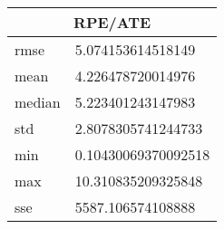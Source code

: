 \begin{table}[!ht] 
 \centering 
 \begin{tabular}{|l|l|} \hline 
 \multicolumn{2}{|c|}{RPE/ATE} \\ \hline 
 rmse & 5.074153614518149 \\ \hline 
mean & 4.226478720014976 \\ \hline 
median & 5.223401243147983 \\ \hline 
std & 2.8078305741244733 \\ \hline 
min & 0.10430069370092518 \\ \hline 
max & 10.310835209325848 \\ \hline 
sse & 5587.106574108888 \\ \hline 
\end{tabular} 
 \end{table}